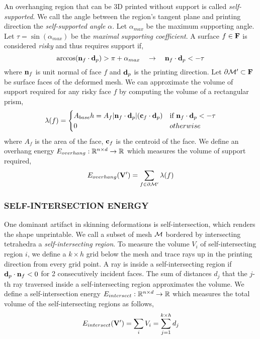 An overhanging region that can be 3D printed without support is called \textit{self-supported}. We call the angle between the region's tangent plane and printing direction the \textit{self-supported angle} $\alpha$. Let $\alpha_{max}$ be the maximum supporting angle. Let $\tau = \sin(\alpha_{max})$ be the \textit{maximal supporting coefficient}. A surface $f\in \mathbf{F}$ is considered \textit{risky} and thus requires support if,
\[
    \arccos(\mathbf{n}_f \cdot \mathbf{d}_{p}) > \pi + \alpha_{max}
    \quad \rightarrow \quad
    \mathbf{n}_f \cdot \mathbf{d}_{p} < - \tau
\]
where $\mathbf{n}_f$ is unit normal of face $f$ and $\mathbf{d}_{p}$ is the printing direction. Let $\partial \mathcal{M}' \subset \mathbf{F}$ be surface faces of the deformed mesh. We can approximate the volume of support required for any risky face $f$ by computing the volume of a rectangular prism,
\[
    \lambda(f) = 
    \begin{cases}
        A_{base} h = A_f |\mathbf{n}_f \cdot \mathbf{d}_{p}| (\mathbf{c}_f \cdot \mathbf{d}_{p}) & \text{if } \mathbf{n}_f \cdot \mathbf{d}_{p} < -\tau \\
        0 & otherwise \\
    \end{cases}
\]
where $A_f$ is the area of the face, $\mathbf{c}_f$ is the centroid of the face. We define an overhang energy $E_{overhang}: \mathbb{R}^{n\times d} \to \mathbb{R}$ which measures the volume of support required,
\[
    E_{overhang}(\mathbf{V}') = \sum_{f\in \partial \mathcal{M}'} \lambda(f)
\]

\subsubsection*{SELF-INTERSECTION ENERGY}

One dominant artifact in skinning deformations is self-intersection, which renders the shape unprintable. We call a subset of mesh $\mathcal{M}$ bordered by intersecting tetrahedra a \textit{self-intersecting region}. To measure the volume $V_i$ of self-intersecting region $i$, we define a $k\times h$ grid below the mesh and trace rays up in the printing direction from every grid point. A ray is inside a self-intersecting region if $\mathbf{d}_{p} \cdot \mathbf{n}_f < 0$ for 2 consecutively incident faces. The sum of distances $d_j$ that the $j$-th ray traversed inside a self-intersecting region approximates the volume. We define a self-intersection energy $E_{intersect}: \mathbb{R}^{n\times d} \to \mathbb{R}$ which measures the total volume of the self-intersecting regions as follows,
\[
    E_{intersect}(\mathbf{V}') = \sum_i V_i = \sum_{j=1}^{k\times h} d_j
\]





